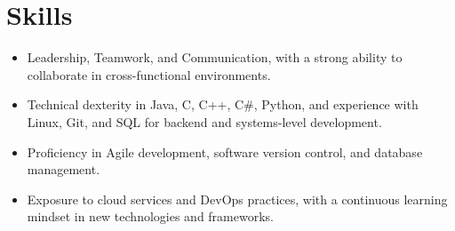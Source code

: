 \section{Skills}
\begin{itemize}
    \item Leadership, Teamwork, and Communication, with a strong ability to collaborate in cross-functional environments.
    \item Technical dexterity in Java, C, C++, C\#, Python, and experience with Linux, Git, and SQL for backend and systems-level development.
    \item Proficiency in Agile development, software version control, and database management.
    \item Exposure to cloud services and DevOps practices, with a continuous learning mindset in new technologies and frameworks.
\end{itemize}
